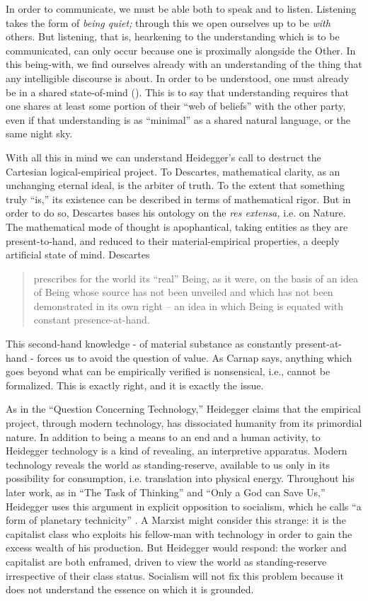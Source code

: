 \documentclass[leqno, 12pt]{turabian-researchpaper}
\begin{document}
	In order to communicate, we must be able both to speak and to listen. Listening
	takes the form of \emph{being quiet;} through this we open ourselves up to be
	\emph{with} others. But listening, that is, hearkening to the understanding
	which is to be communicated, can only occur because one is proximally alongside
	the Other. In this being-with, we find ourselves already with an understanding
	of the thing that any intelligible discourse is about. In order to be
	understood, one must already be in a shared state-of-mind ().
	This is to say that understanding requires that one shares at least some
	portion of their \enquote{web of beliefs} with the other party, even if that
	understanding is as \enquote{minimal} as a shared natural language, or the
	same night sky.

	With all this in mind we can understand Heidegger's call to destruct the
	Cartesian logical-empirical project. To Descartes, mathematical clarity, as an
	unchanging eternal ideal, is the arbiter of truth. To the extent that something
	truly \enquote{is,} its existence can be described in terms of mathematical
	rigor. But in order to do so, Descartes bases his ontology on the \textit{res
	extensa,} i.e. on Nature. The mathematical mode of thought is apophantical,
	taking entities as they are present-to-hand, and reduced to their material-empirical
	properties, a deeply artificial state of mind. Descartes \blockquote[{}]{prescribes for the world its \enquote{real} Being, as it were, on the basis of an idea of Being whose source has not been unveiled and which has not been demonstrated in its own right -- an idea in which Being is equated with constant presence-at-hand.}
	This second-hand knowledge - of material substance as constantly present-at-hand
	- forces us to avoid the question of value. As Carnap says, anything which goes
	beyond what can be empirically verified is nonsensical, i.e., cannot be
	formalized. This is exactly right, and it is exactly the issue.

	As in the \enquote{Question Concerning Technology,} \nocite{heidegger2008c}
	Heidegger claims that the empirical project, through modern technology, has
	dissociated humanity from its primordial nature. In addition to being a means to
	an end and a human activity, to Heidegger technology is a kind of revealing, an
	interpretive apparatus. Modern technology reveals the world as standing-reserve,
	available to us only in its possibility for consumption, i.e. translation into
	physical energy. Throughout his later work, as in \enquote{The Task of Thinking}\nocite{heidegger2008d}
	and \enquote{Only a God can Save Us,} Heidegger uses this argument in explicit
	opposition to socialism, which he calls \enquote{a form of planetary technicity}
	\autocite[p206]{heidegger1981}. A Marxist might consider this strange: it is the
	capitalist class who exploits his fellow-man with technology in order to gain the
	excess wealth of his production. But Heidegger would respond: the worker and capitalist
	are both enframed, driven to view the world as standing-reserve irrespective
	of their class status. Socialism will not fix this problem because it does not
	understand the essence on which it is grounded.
\end{document}

